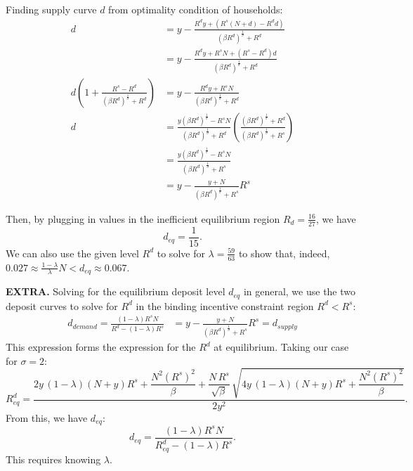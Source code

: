 \documentclass[12pt]{article}
\begin{document}
\begin{enumerate}
\begin{enumerate}
        Finding supply curve $d$ from optimality condition of households: 
        \begin{align*}
             d  &= y - \frac{R^{d}y+(R^s(N+d) - R^d d )}{\left(\beta R^{d}\right)^{\frac{1}{\sigma}}+R^{d}}%
             \\ &= y - \frac{R^{d}y+R^sN +(R^s- R^d) d}{\left(\beta R^{d}\right)^{\frac{1}{\sigma}}+R^{d}}
              \\ d \left(1 + \frac{R^s- R^d}{\left(\beta R^{d}\right)^{\frac{1}{\sigma}}+R^{d}} \right)&= y - \frac{R^{d}y+R^sN}{\left(\beta R^{d}\right)^{\frac{1}{\sigma}}+R^{d}}
               \\  d &= \frac{y\left(\beta R^{d}\right)^{\frac{1}{\sigma}}- R^sN}{\left(\beta R^{d}\right)^{\frac{1}{\sigma}}+R^{d}}\left(\frac{\left(\beta R^{d}\right)^{\frac{1}{\sigma}}+R^{d}}{\left(\beta R^{d}\right)^{\frac{1}{\sigma}} + R^s}\right)
                \\ &= \frac{y\left(\beta R^{d}\right)^{\frac{1}{\sigma}}- R^sN}{\left(\beta R^{d}\right)^{\frac{1}{\sigma}} + R^s}
                 \\ &= y-\frac{y+N}{\left(\beta R^{d}\right)^{\frac{1}{\sigma}}+R^{s}}R^{s}
        \end{align*}

        Then, by plugging in values in the inefficient equilibrium region $R_d = \frac{16}{27}$, we have 
        \[ d_{eq}= \frac{1}{15}. \]
        We can also use the given level $R^d$ to solve for $\lambda = \frac{59}{63}$ to show that, indeed, $ 0.027 \approx \frac{1-\lambda}{\lambda}N < d_{eq} \approx 0.067$.
        
        \textbf{EXTRA. }
        Solving for the  equilibrium deposit level $d_{eq}$ in general, we use the two deposit curves to solve for $R^d$ in the binding incentive constraint region $R^d < R^s$:
        \begin{align*}
            d_{demand}= \frac{(1-\lambda)R^s N }{R^d - (1-\lambda)R^s  } &=  y-\frac{y+N}{\left(\beta R^{d}\right)^{\frac{1}{\sigma}}+R^{s}}R^{s} =d_{supply}
        \end{align*}
        This expression forms the expression for the $R^d$ at equilibrium. Taking our case for $\sigma=2$:
        \[R^d_{eq} = \frac{2y\,(1-\lambda)(N+y)R^s + \dfrac{N^2 (R^s)^2}{\beta} +\dfrac{N\,R^s}{\sqrt{\beta}}\,\sqrt{4y\,(1-\lambda)(N+y)R^s + \dfrac{N^2 (R^s)^2}{\beta}}}{2y^2}.\]
        From this, we have $d_{eq}$:
        \[d_{eq} = \frac{(1-\lambda)R^s N }{R^d_{eq}-  (1-\lambda)R^s  }.\]
        This requires knowing $\lambda.$
 

\end{enumerate}
\end{enumerate}
\end{document}
